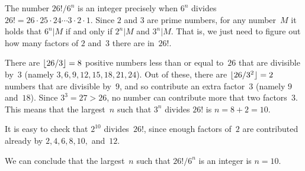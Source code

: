 \documentclass{jn-pset}
\begin{document}
\begin{solution}
  The number
  $26! / 6^n$
  is an integer precisely when
  $6^n$ divides $26! = 26 \cdot 25  \cdot 24  \cdots 3  \cdot 2  \cdot 1$.
  Since $2$ and $3$ are prime numbers, for any number~$M$ it holds that
  $6^n | M$
  if and only if
  $2^n | M$
  and
  $3^n | M$.
  That is, we just need to figure out how many factors of $2$ and~$3$ there are in~$26!$.

  There are
  $\lfloor 26/3 \rfloor = 8$
  positive numbers less than or equal to~$26$
  that are divisible by~$3$
  (namely 
  $
  3, 6, 9, 12, 15, 18, 21, 24
  $).
  Out of these, there are
  $\lfloor 26/3^2 \rfloor = 2$
  numbers  that are divisible by~$9$, and so contribute an extra
  factor~$3$
  (namely $9$ and~$18$).
  Since $3^3 = 27 > 26$, no number can contribute more that two factors~$3$.
  This means that the largest~$n$ such that $3^n$ divides $26!$ is
  $n = 8 + 2 =  10$.
  
  It is easy to check that $2^{10}$ divides~$26!$, since enough factors
  of~$2$ are contributed already by $2, 4, 6, 8, 10,$ and~$12$.

  We can conclude that the largest~$n$ such that
  $26! / 6^n$
  is an integer is $n = 10$.  
\end{solution}

\end{document}
